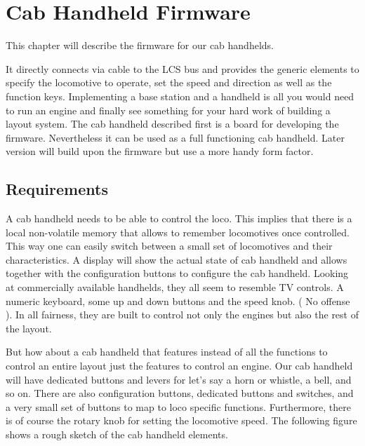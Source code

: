 \chapter{Cab Handheld Firmware}


This chapter will describe the firmware for our cab handhelds. 


 It directly connects via cable to the LCS bus and provides the generic elements to specify the locomotive to operate, set the speed and direction as well as the function keys. Implementing a base station and a handheld is all you would need to run an engine and finally see something for your hard work of building a layout system. The cab handheld described first is a board for developing the firmware. Nevertheless it can be used as a full functioning cab handheld. Later version will build upon the firmware but use a more handy form factor.

\section{Requirements}

A cab handheld needs to be able to control the loco. This implies that there is a local non-volatile memory that allows to remember locomotives once controlled. This way one can easily switch between a small set of locomotives and their characteristics. A display will show the actual state of cab handheld and allows together with the configuration buttons to configure the cab handheld. Looking at commercially available handhelds, they all seem to resemble TV controls. A numeric keyboard, some up and down buttons and the speed knob. ( No offense ). In all fairness, they are built to control not only the engines but also the rest of the layout.

But how about a cab handheld that features instead of all the functions to control an entire layout just the features to control an engine. Our cab handheld will have dedicated buttons and levers for let's say a horn or whistle, a bell, and so on. There are also configuration buttons, dedicated buttons and switches, and a very small set of buttons to map to loco specific functions. Furthermore, there is of course the rotary knob for setting the locomotive speed. The following figure shows a rough sketch of the cab handheld elements.

